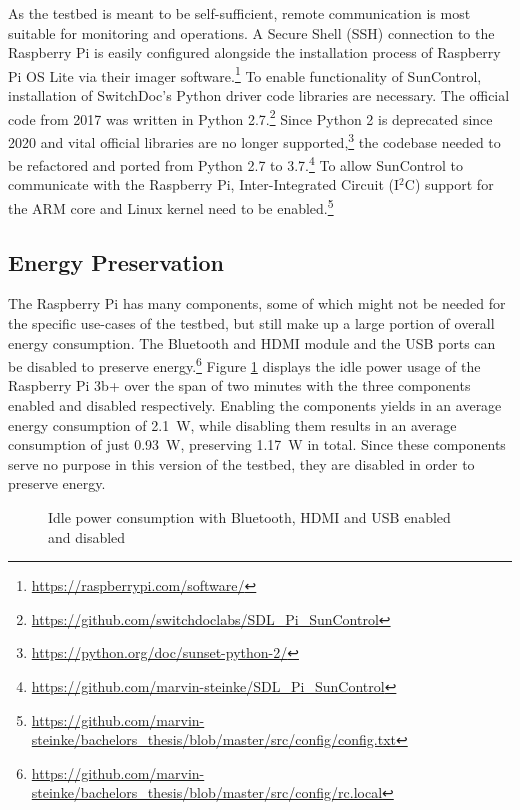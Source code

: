 As the testbed is meant to be self-sufficient, remote communication is most
suitable for monitoring and operations. A Secure Shell (SSH) connection to the
Raspberry Pi is easily configured alongside the installation process of
Raspberry Pi OS Lite via their imager
software.\footnote{\url{https://raspberrypi.com/software/}} To enable
functionality of SunControl, installation of SwitchDoc's Python driver code
libraries are necessary. The official code from 2017 was written in Python
2.7.\footnote{\url{https://github.com/switchdoclabs/SDL_Pi_SunControl}} Since
Python 2 is deprecated since 2020 and vital official libraries are no longer
supported,\footnote{\url{https://python.org/doc/sunset-python-2/}} the codebase
needed to be refactored and ported from Python 2.7 to
3.7.\footnote{\url{https://github.com/marvin-steinke/SDL_Pi_SunControl}} To
allow SunControl to communicate with the Raspberry Pi, Inter-Integrated Circuit
(I$^2$C) support for the ARM core and Linux kernel need to be
enabled.\footnote{\label{footnote:config}\url{https://github.com/marvin-steinke/bachelors_thesis/blob/master/src/config/config.txt}}

\subsection{Energy Preservation}

The Raspberry Pi has many components, some of which might not be needed for the
specific use-cases of the testbed, but still make up a large portion of overall
energy consumption. The Bluetooth and HDMI module and the USB ports can be
disabled to preserve
energy.\footnote{\url{https://github.com/marvin-steinke/bachelors_thesis/blob/master/src/config/rc.local}}
Figure \ref{fig:idle} displays the idle power usage of the Raspberry Pi 3b+ over
the span of two minutes with the three components enabled and disabled
respectively. Enabling the components yields in an average energy consumption of
\mbox{2.1 W}, while disabling them results in an average consumption of just
\mbox{0.93 W}, preserving \mbox{1.17 W} in total. Since these components serve
no purpose in this version of the testbed, they are disabled in order to
preserve energy.

\begin{figure}[H]
    \centering
    
    \caption{Idle power consumption with Bluetooth, HDMI and USB enabled and disabled}
    \label{fig:idle}
\end{figure}

